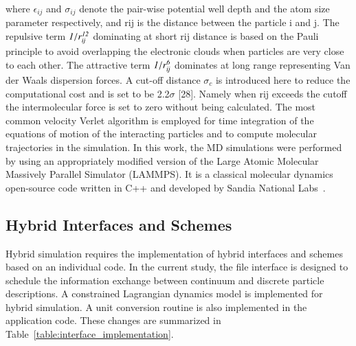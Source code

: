 \documentclass[preprint,12pt]{elsarticle}
\newcommand{\Nkimnote}[1]{ {\textcolor{blue} { ***NKim: #1 }}}
\newcommand{\Nkimnote}[1]{}
\begin{document}
where  $\epsilon_{ij}$ and $\sigma_{ij}$ denote the pair-wise potential well depth and the atom size parameter respectively, and rij is the distance between the particle i and j. The repulsive term $\it 1/r_{ij}^{12}$ dominating at short rij distance is based on the Pauli principle to avoid overlapping the electronic clouds when particles are very close to each other. The attractive term $\it 1/r_{ij}^{6}$ dominates at long range representing Van der Waals dispersion forces. A cut-off distance $\sigma_{c}$  is introduced here to reduce the computational cost and is set to be 2.2$\sigma$  [28]. Namely when rij exceeds the cutoff the intermolecular force is set to zero without being calculated.
The most common velocity Verlet algorithm is employed for time integration of the equations of motion of the interacting particles and to compute molecular trajectories in the simulation. 
In this work, the MD simulations were performed by using an appropriately modified version of the Large Atomic Molecular Massively Parallel Simulator (LAMMPS). It is a classical molecular dynamics open-source code written in C++ and developed by Sandia National Labs~\cite{LAMMPS}.


\subsection{Hybrid Interfaces and Schemes}

Hybrid simulation requires the implementation of hybrid interfaces and schemes based on an individual code. In the current study, the file interface is designed to schedule the information exchange between continuum and discrete particle descriptions. A constrained Lagrangian dynamics model is implemented for hybrid simulation. A unit conversion routine is also implemented in the application code. These changes are summarized in Table~\ref{table:interface_implementation}. 
\end{document}
